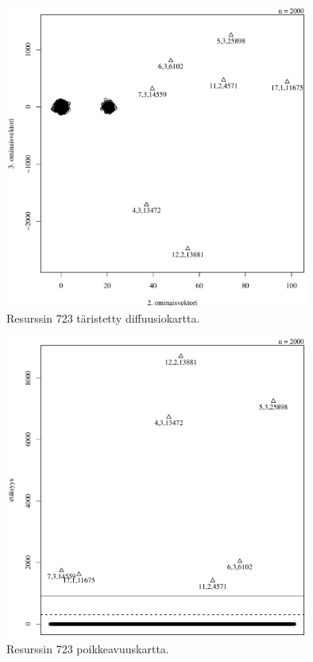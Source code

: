 \begin{figure}[p]
\centering
\includegraphics[width=10cm]{pics/diffuusiokuvat/service_723.pdf}
\caption{Resurssin 723 täristetty diffuusiokartta.}
\label{diffuusio_723}
\end{figure}

\begin{figure}[p]
\centering
\includegraphics[width=10cm]{pics/tiheyskuvat/service_723.pdf}
\caption{Resurssin 723 poikkeavuuskartta.}
\label{service_723}
\end{figure}

